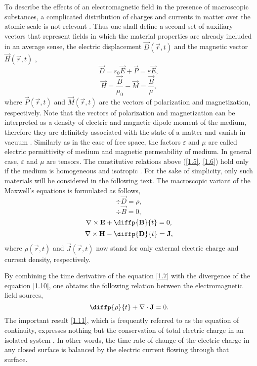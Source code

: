 To describe the effects of an electromagnetic field in the presence of macroscopic substances, a complicated distribution of charges and currents in matter over the atomic scale is not relevant \cite{Jackson2005}. Thus one shall define a second set of auxiliary vectors that represent fields in which the material properties are already included in an average sense, the electric displacement $ \vec{D}\left( \vec{r}, t \right) $ and the magnetic vector $ \vec{H}\left( \vec{r}, t \right) $ \cite{Feynman1963},
\begin{equation}
\label{1.5}
\vec{D} = \varepsilon_0 \vec{E} + \vec{P} = \varepsilon \vec{E},
\end{equation}
\begin{equation}
\label{1.6}
\vec{H} = \frac{\vec{B}}{\mu_0} - \vec{M} = \frac{\vec{B}}{\mu},
\end{equation}
where $ \vec{P}\left( \vec{r}, t \right) $ and $ \vec{M}\left( \vec{r}, t \right) $ are the vectors of polarization and magnetization, respectively. Note that the vectors of polarization and magnetization can be interpreted as a density of electric and magnetic dipole moment of the medium, therefore they are definitely associated with the state of a matter and vanish in vacuum \cite{Stratton2007}. Similarly as in the case of free space, the factors $ \varepsilon $ and $ \mu $ are called electric permittivity of medium and magnetic permeability of medium. In general case, $ \varepsilon $ and $ \mu $ are tensors. The constitutive relations above (\ref{1.5}, \ref{1.6}) hold only if the medium is homogeneous and isotropic \cite{Thide2011}. For the sake of simplicity, only such materials will be considered in the following text. The macroscopic variant of the Maxwell's equations is formulated as follows,
\begin{equation}
\label{1.7}
\div{\vec{D}} = \rho,
\end{equation}
\begin{equation}
\label{1.8}
\div{\vec{B}} = 0,
\end{equation}
\begin{equation}
\label{1.9}
\rot{\vec{E}} + \diffp{\vec{B}}{t} = 0,
\end{equation}
\begin{equation}
\label{1.10}
\rot{\vec{H}} - \diffp{\vec{D}}{t} = \vec{J},
\end{equation}
where $ \rho\left(\vec{r}, t \right) $ and $ \vec{J}\left(\vec{r}, t \right) $ now stand for only external electric charge and current density, respectively.

By combining the time derivative of the equation \ref{1.7} with the divergence of the equation \ref{1.10}, one obtains the following relation between the electromagnetic field sources,
\begin{equation}
\label{1.11}
\diffp{\rho}{t} + \div{\vec{J}} = 0.
\end{equation}
The important result \ref{1.11}, which is frequently referred to as the equation of continuity, expresses nothing but the conservation of total electric charge in an isolated system \cite{Feynman1963}. In other words, the time rate of change of the electric charge in any closed surface is balanced by the electric current flowing through that surface.